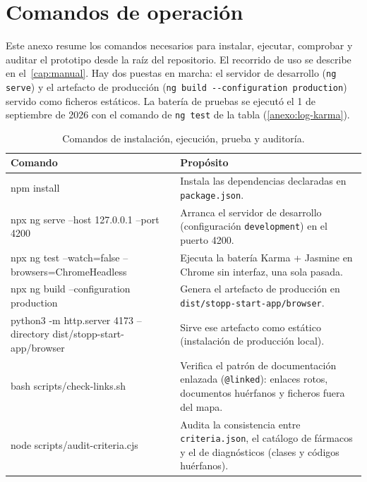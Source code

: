 
\chapter{Comandos de operación}
\label{anexo:comandos}

Este anexo resume los comandos necesarios para instalar, ejecutar,
comprobar y auditar el prototipo desde la raíz del repositorio. El
recorrido de uso se describe en el~\cref{cap:manual}. Hay dos puestas en
marcha: el servidor de desarrollo (\texttt{ng serve}) y el artefacto de
producción (\texttt{ng build -{}-configuration production}) servido como
ficheros estáticos. La batería de pruebas se ejecutó el 1 de septiembre
de 2026 con el comando de \texttt{ng test} de la tabla
(\cref{anexo:log-karma}).

\begin{table}[H]
  \centering
  \scriptsize
  \begin{tabularx}{\textwidth}{@{}>{\raggedright\ttfamily}p{7.4cm}X@{}}
    \toprule
    \textbf{\normalfont Comando} & \textbf{Propósito} \\
    \midrule
    npm install &
      Instala las dependencias declaradas en \texttt{package.json}. \\
    npx ng serve
    --host 127.0.0.1 --port 4200 &
      Arranca el servidor de desarrollo (configuración
      \texttt{development}) en el puerto 4200. \\
    npx ng test --watch=false
    --browsers=ChromeHeadless &
      Ejecuta la batería Karma + Jasmine en Chrome sin interfaz, una
      sola pasada. \\
    npx ng build
    --configuration production &
      Genera el artefacto de producción en
      \texttt{dist/stopp-start-app/browser}. \\
    python3 -m http.server 4173
    --directory dist/stopp-start-app/browser &
      Sirve ese artefacto como estático (instalación de producción local). \\
    bash scripts/check-links.sh &
      Verifica el patrón de documentación enlazada (\texttt{@linked}):
      enlaces rotos, documentos huérfanos y ficheros fuera del mapa. \\
    node scripts/audit-criteria.cjs &
      Audita la consistencia entre \texttt{criteria.json}, el catálogo
      de fármacos y el de diagnósticos (clases y códigos huérfanos). \\
    \bottomrule
  \end{tabularx}
  \caption{Comandos de instalación, ejecución, prueba y auditoría.}
  \label{tab:comandos-operacion}
\end{table}

